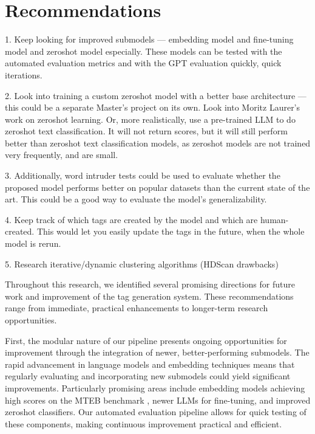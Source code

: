 \section{Recommendations}
1. Keep looking for improved submodels — embedding model and fine-tuning model and zeroshot model especially. These models can be tested with the automated evaluation metrics and with the GPT evaluation quickly, quick iterations.

2. Look into training a custom zeroshot model with a better base architecture — this could be a separate Master's project on its own. Look into Moritz Laurer's work on zeroshot learning. Or, more realistically, use a pre-trained LLM to do zeroshot text classification. It will not return scores, but it will still perform better than zeroshot text classification models, as zeroshot models are not trained very frequently, and are small.

3. Additionally, word intruder tests could be used to evaluate whether the proposed model performs better on popular datasets than the current state of the art. This could be a good way to evaluate the model's generalizability.

4. Keep track of which tags are created by the model and which are human-created. This would let you easily update the tags in the future, when the whole model is rerun.

5. Research iterative/dynamic clustering algorithms (HDScan drawbacks)


Throughout this research, we identified several promising directions for future work and improvement of the tag generation system. These recommendations range from immediate, practical enhancements to longer-term research opportunities.

First, the modular nature of our pipeline presents ongoing opportunities for improvement through the integration of newer, better-performing submodels. The rapid advancement in language models and embedding techniques means that regularly evaluating and incorporating new submodels could yield significant improvements. Particularly promising areas include embedding models achieving high scores on the MTEB benchmark \cite{muennighoff_mteb_2023}, newer LLMs for fine-tuning, and improved zeroshot classifiers. Our automated evaluation pipeline allows for quick testing of these components, making continuous improvement practical and efficient.

